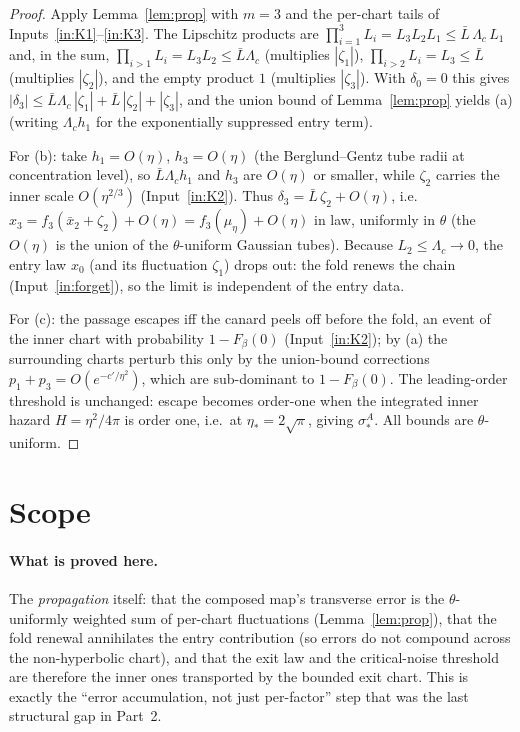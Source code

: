 \documentclass[11pt]{article}
\theoremstyle{definition}
\theoremstyle{remark}
\begin{document}
\begin{proof}
Apply Lemma~\ref{lem:prop} with $m=3$ and the per-chart tails of
Inputs~\ref{in:K1}--\ref{in:K3}. The Lipschitz products are
$\prod_{i=1}^3 L_i=L_3 L_2 L_1\le \bar L\,\Lambda_c\,L_1$ and, in the sum,
$\prod_{i>1}L_i=L_3L_2\le\bar L\Lambda_c$ (multiplies $|\zeta_1|$),
$\prod_{i>2}L_i=L_3\le\bar L$ (multiplies $|\zeta_2|$), and the empty product $1$
(multiplies $|\zeta_3|$). With $\delta_0=0$ this gives
$|\delta_3|\le \bar L\Lambda_c\,|\zeta_1|+\bar L\,|\zeta_2|+|\zeta_3|$, and the union
bound of Lemma~\ref{lem:prop} yields (a) (writing $\Lambda_c h_1$ for the exponentially
suppressed entry term).

For (b): take $h_1=O(\eta)$, $h_3=O(\eta)$ (the Berglund--Gentz tube radii at
concentration level), so $\bar L\Lambda_c h_1$ and $h_3$ are $O(\eta)$ or smaller, while
$\zeta_2$ carries the inner scale $O(\eta^{2/3})$ (Input~\ref{in:K2}). Thus
$\delta_3=\bar L\,\zeta_2+O(\eta)$, i.e.\ $x_3=f_3(\bar x_2+\zeta_2)+O(\eta)
=f_3(\mu_\eta)+O(\eta)$ in law, uniformly in $\theta$ (the $O(\eta)$ is the union of the
$\theta$-uniform Gaussian tubes). Because $L_2\le\Lambda_c\to0$, the entry law $x_0$ (and
its fluctuation $\zeta_1$) drops out: the fold renews the chain (Input~\ref{in:forget}),
so the limit is independent of the entry data.

For (c): the passage escapes iff the canard peels off before the fold, an event of the
inner chart with probability $1-F_\beta(0)$ (Input~\ref{in:K2}); by (a) the surrounding
charts perturb this only by the union-bound corrections $p_1+p_3=O(e^{-c'/\eta^2})$, which
are sub-dominant to $1-F_\beta(0)$. The leading-order threshold is unchanged: escape
becomes order-one when the integrated inner hazard $H=\eta^2/4\pi$ is order one, i.e.\ at
$\eta_*=2\sqrt\pi$, giving $\sigma_*^A$. All bounds are $\theta$-uniform.
\end{proof}

\section{Scope}

\paragraph{What is proved here.} The \emph{propagation} itself: that the composed map's
transverse error is the $\theta$-uniformly weighted sum of per-chart fluctuations
(Lemma~\ref{lem:prop}), that the fold renewal annihilates the entry contribution
(so errors do not compound across the non-hyperbolic chart), and that the exit law and
the critical-noise threshold are therefore the inner ones transported by the bounded exit
chart. This is exactly the ``error accumulation, not just per-factor'' step that was the
last structural gap in Part~2.
\end{document}
